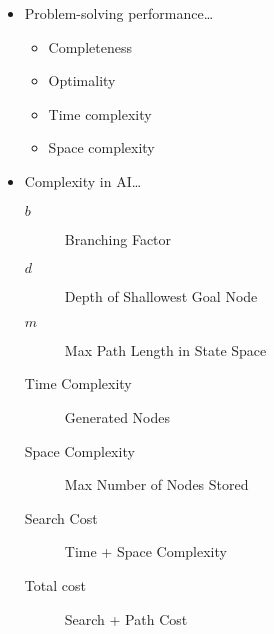 \begin{itemize}
        \item Problem-solving performance\ldots
            \begin{itemize}
                \item Completeness
                \item Optimality
                \item Time complexity
                \item Space complexity
            \end{itemize}

        \item Complexity in AI\ldots
            \begin{description}
                \item[$b$] Branching Factor
                \item[$d$] Depth of Shallowest Goal Node
                \item[$m$] Max Path Length in State Space
                \item[Time Complexity] Generated Nodes
                \item[Space Complexity] Max Number of Nodes Stored
                \item[Search Cost] Time + Space Complexity
                \item[Total cost] Search + Path Cost
            \end{description}
\end{itemize}

